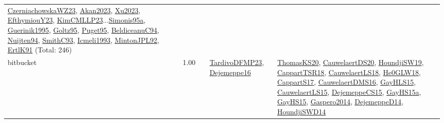{\begin{longtable}{p{3cm}r>{\raggedright\arraybackslash}p{6cm}>{\raggedright\arraybackslash}p{6cm}>{\raggedright\arraybackslash}p{8cm}}
\hyperref[detail:CzerniachowskaWZ23]{CzerniachowskaWZ23}, \hyperref[detail:Akan2023]{Akan2023}, \hyperref[detail:Xu2023]{Xu2023}, \hyperref[detail:EfthymiouY23]{EfthymiouY23}, \hyperref[detail:KimCMLLP23]{KimCMLLP23}...\hyperref[detail:Simonis95a]{Simonis95a}, \hyperref[detail:Guerinik1995]{Guerinik1995}, \hyperref[detail:Goltz95]{Goltz95}, \hyperref[detail:Puget95]{Puget95}, \hyperref[detail:BeldiceanuC94]{BeldiceanuC94}, \hyperref[detail:Nuijten94]{Nuijten94}, \hyperref[detail:SmithC93]{SmithC93}, \hyperref[detail:Icmeli1993]{Icmeli1993}, \hyperref[detail:MintonJPL92]{MintonJPL92}, \hyperref[detail:ErtlK91]{ErtlK91} (Total: 246)\\
\index{bitbucket}\index{Benchmarks!bitbucket}bitbucket &  1.00 &  & \hyperref[detail:TardivoDFMP23]{TardivoDFMP23}, \hyperref[detail:Dejemeppe16]{Dejemeppe16} & \hyperref[detail:ThomasKS20]{ThomasKS20}, \hyperref[detail:CauwelaertDS20]{CauwelaertDS20}, \hyperref[detail:HoundjiSW19]{HoundjiSW19}, \hyperref[detail:CappartTSR18]{CappartTSR18}, \hyperref[detail:CauwelaertLS18]{CauwelaertLS18}, \hyperref[detail:He0GLW18]{He0GLW18}, \hyperref[detail:CappartS17]{CappartS17}, \hyperref[detail:CauwelaertDMS16]{CauwelaertDMS16}, \hyperref[detail:GayHLS15]{GayHLS15}, \hyperref[detail:CauwelaertLS15]{CauwelaertLS15}, \hyperref[detail:DejemeppeCS15]{DejemeppeCS15}, \hyperref[detail:GayHS15a]{GayHS15a}, \hyperref[detail:GayHS15]{GayHS15}, \hyperref[detail:Gaspero2014]{Gaspero2014}, \hyperref[detail:DejemeppeD14]{DejemeppeD14}, \hyperref[detail:HoundjiSWD14]{HoundjiSWD14}\\

\end{longtable}}
